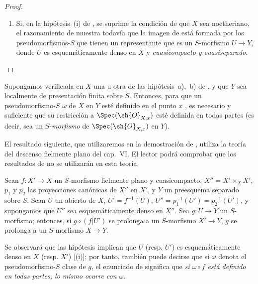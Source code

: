 \begin{proof}
\begin{remarks}[20.3.8.7]
\begin{enumerate}[label=(\roman*)]
  \item Si, en la hipótesis~(i) de , se suprime la condición de que $X$ sea noetheriano, el razonamiento de  muestra todavía que la imagen de  está formada por los pseudomorfismos-$S$ que tienen un representante que es un $S$-morfismo $U\to Y$, donde $U$ es esquemáticamente denso en $X$ y \emph{cuasicompacto y cuasiseparado}.
\end{enumerate}
\end{remarks}
\end{proof}

\begin{corollary}[20.3.9]
\label{IV.20.3.9}
Supongamos verificada en $X$ una u otra de las hipótesis~\textup{a)},~\textup{b)} de , y que $Y$ sea localmente de presentación finita sobre $S$.
Entonces, para que un pseudomorfismo-$S$ $\omega$ de $X$ en $Y$ esté definido en el punto $x$ , es necesario y suficiente que su restricción a $\Spec(\sh{O}_{X,x})$ esté definida en todas partes \textup{(es decir, sea un $S$-\emph{morfismo} de $\Spec(\sh{O}_{X,x})$ en $Y$)}.
\end{corollary}

El resultado siguiente, que utilizaremos en la demostración de , utiliza la teoría del descenso fielmente plano del cap.~VI.
El lector podrá comprobar que los resultados de  no se utilizarán en esta teoría.

\begin{lemma}[20.3.10]
\label{IV.20.3.10}
Sean $f:X'\to X$ un $S$-morfismo fielmente plano y cuasicompacto, $X''=X'\times_X X'$, $p_1$ y $p_2$ las proyecciones canónicas de $X''$ en $X'$, y $Y$ un preesquema separado sobre $S$.
Sean $U$ un abierto de $X$, $U'=f^{-1}(U)$, $U''=p_1^{-1}(U')=p_2^{-1}(U')$, y supongamos que $U''$ sea esquemáticamente denso en $X''$.
Sea $g:U\to Y$ un $S$-morfismo; entonces, si $g\circ(f|U')$ se prolonga a un $S$-morfismo $X'\to Y$, $g$ se prolonga a un $S$-morfismo $X\to Y$.
\end{lemma}

Se observará que las hipótesis implican que $U$ (resp. $U'$) es esquemáticamente denso en $X$ (resp. $X'$) [(i)]; por tanto, también puede decirse que si $\omega$ denota el pseudomorfismo-$S$ clase de $g$, el enunciado de  significa que \emph{si $\omega\circ f$ está definido en todas partes, lo mismo ocurre con $\omega$}.

